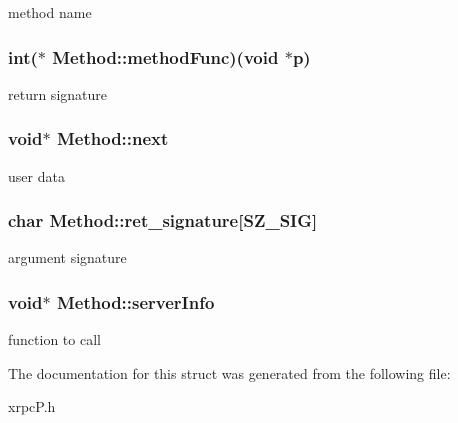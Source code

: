 method name \hypertarget{structMethod_85a3d15d92263dff37d46aeefd9a3130}{
\subsubsection[{methodFunc}]{\setlength{\rightskip}{0pt plus 5cm}int($\ast$ {\bf Method::methodFunc})(void $\ast$p)}}
\label{structMethod_85a3d15d92263dff37d46aeefd9a3130}


return signature \hypertarget{structMethod_592bee93da850f60c429e916bb2919f6}{
\subsubsection[{next}]{\setlength{\rightskip}{0pt plus 5cm}void$\ast$ {\bf Method::next}}}
\label{structMethod_592bee93da850f60c429e916bb2919f6}


user data \hypertarget{structMethod_36b279c8c386e858838167a9464415b4}{
\subsubsection[{ret\_\-signature}]{\setlength{\rightskip}{0pt plus 5cm}char {\bf Method::ret\_\-signature}\mbox{[}SZ\_\-SIG\mbox{]}}}
\label{structMethod_36b279c8c386e858838167a9464415b4}


argument signature \hypertarget{structMethod_e8ee031515917a254fb39016c1a7df87}{
\subsubsection[{serverInfo}]{\setlength{\rightskip}{0pt plus 5cm}void$\ast$ {\bf Method::serverInfo}}}
\label{structMethod_e8ee031515917a254fb39016c1a7df87}


function to call 

The documentation for this struct was generated from the following file:\begin{CompactItemize}
\item 
xrpcP.h\end{CompactItemize}
